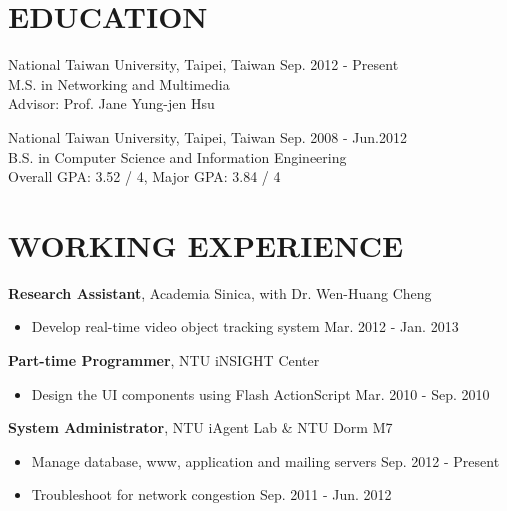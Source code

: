 \documentclass[margin]{main}
\begin{document}
 
 

\address{
    4F., No.10, Aly. 4, Ln. 201, Yucheng St., \\
    Nangang Dist., Taipei City 115, \\
    Taiwan (R.O.C)
}

\address{
    \hfill +886-923-869-910 \\
    \hfill john.lin.chichin@gmail.com
}

\begin{resume}
 
\section{EDUCATION}
National Taiwan University, Taipei, Taiwan \hfill Sep. 2012 - Present \\
M.S. in Networking and Multimedia \\
Advisor: Prof. Jane Yung-jen Hsu
 
National Taiwan University, Taipei, Taiwan \hfill Sep. 2008 - Jun.2012 \\
B.S. in Computer Science and Information Engineering \\
Overall GPA: 3.52 / 4, Major GPA: 3.84 / 4

\section{WORKING EXPERIENCE}
{\bf Research Assistant}, Academia Sinica, with Dr. Wen-Huang Cheng
\begin{itemize} \itemsep -2pt
    \item[] Develop real-time video object tracking system \hfill Mar. 2012 - Jan. 2013
\end{itemize}

{\bf Part-time Programmer}, NTU iNSIGHT Center
\begin{itemize} \itemsep -2pt
    \item[] Design the UI components using Flash ActionScript \hfill Mar. 2010 - Sep. 2010
\end{itemize}

{\bf System Administrator}, NTU iAgent Lab \& NTU Dorm M7
\begin{itemize} \itemsep -2pt
    \item[] Manage database, www, application and mailing servers \hfill Sep. 2012 - Present
    \item[] Troubleshoot for network congestion \hfill Sep. 2011 - Jun. 2012
\end{itemize}


\end{resume}
\end{document}
